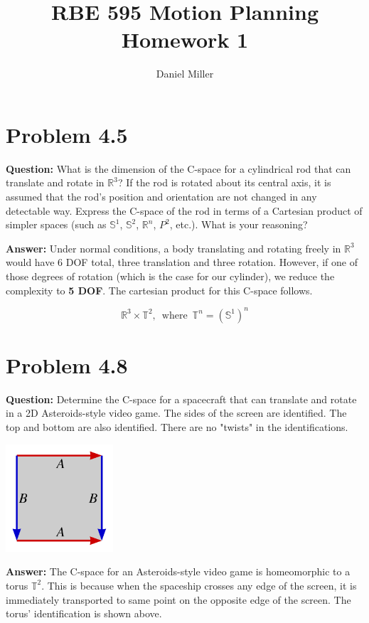 \documentclass[10pt,letterpaper]{article}
\title{RBE 595 Motion Planning \\ \large Homework 1}
\author{Daniel Miller}
\begin{document}
\maketitle

\section{Problem 4.5}
\textbf{Question: } What is the dimension of the C-space for a cylindrical rod that can translate and rotate in  $ {\mathbb{R}}^3$? If the rod is rotated about its central axis, it is assumed that the rod's position and orientation are not changed in any detectable way. Express the C-space of the rod in terms of a Cartesian product of simpler spaces (such as  $ {\mathbb{S}}^1$,  $ {\mathbb{S}}^2$,  $ {\mathbb{R}}^n$, $ P^2$, etc.). What is your reasoning?

\textbf{Answer: } Under normal conditions, a body translating and rotating freely in $\mathbb{R}^3$ would have 6 DOF total, three translation and three rotation. However, if one of those degrees of rotation (which is the case for our cylinder), we reduce the complexity to \textbf{5 DOF}. The cartesian product for this C-space follows.

\begin{equation}
\mathbb{R}^3 \times \mathbb{T}^2, \,\,\, \mbox{where} \,\,\, \mathbb{T}^n = (\mathbb{S}^1)^n
\end{equation}


\section{Problem 4.8}
\textbf{Question: } Determine the C-space for a spacecraft that can translate and rotate in a 2D Asteroids-style video game. The sides of the screen are identified. The top and bottom are also identified. There are no "twists" in the identifications.

\begin{center}
\includegraphics[width=0.3\textwidth]{torus}
\end{center}
\textbf{Answer: } The C-space for an Asteroids-style video game is homeomorphic to a torus $\mathbb{T}^2$. This is because when the spaceship crosses any edge of the screen, it is immediately transported to same point on the opposite edge of the screen. The torus' identification is shown above. 
\end{document}
